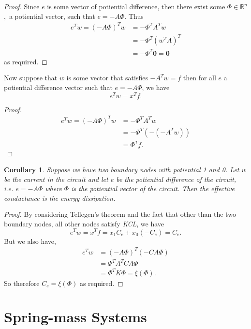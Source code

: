 \documentclass[]{article}
\newtheorem{corollary}{Corollary}[theorem]
\begin{document}
\begin{proof}
Since $e$ is some vector of potiential difference, then there exist some $\Phi \in \mathbb{R}^n$, a potiential 
vector, such that $e = -A\Phi$. Thus
\begin{align*}
e^T w = (- A\Phi)^T w & = - \Phi^T A^T w \\
& = - \Phi^T (w^T A)^T\\
& = - \Phi^T \mathbf{0} = \mathbf{0}
\end{align*}
as required.
\end{proof}

Now suppose that \(w\) is some vector that satisfies \(-A^T w = f\) then
for all \(e\) a potiential difference vector such that \(e = -A\Phi\),
we have \[
e^T w = x^T f.
\]

\begin{proof}
\begin{align*}
e^T w = (- A\Phi)^T w &= - \Phi^T A^T w \\
& = - \Phi^T (- (- A^T w))\\
& = \Phi^T f. 
\end{align*}
\end{proof}

\begin{corollary}
Suppose we have two boundary nodes with potiential 1 and 0. Let $w$ be the current in the circuit 
and let $e$ be the potiential difference of the circuit, i.e. $e = -A\Phi$ where $\Phi$ is the potiential 
vector of the circuit. Then the effective conductance is the energy dissipation.
\end{corollary}

\begin{proof}
By considering Tellegen's theorem and the fact that other than the two boundary nodes, all other nodes 
satisfy \textit{KCL}, we have
$$
e^T w = x^T f = x_1 C_e + x_0 (-C_e) = C_e.
$$
But we also have, 
\begin{align*}
e^T w & = (-A\Phi)^T(-CA\Phi)\\
& = \Phi^T A^T CA\Phi\\
& = \Phi^T K \Phi = \xi(\Phi).
\end{align*}
So therefore $C_e = \xi(\Phi)$ as required.
\end{proof}

\newpage

\section{Spring-mass Systems}\label{spring-mass-systems}
\end{document}
